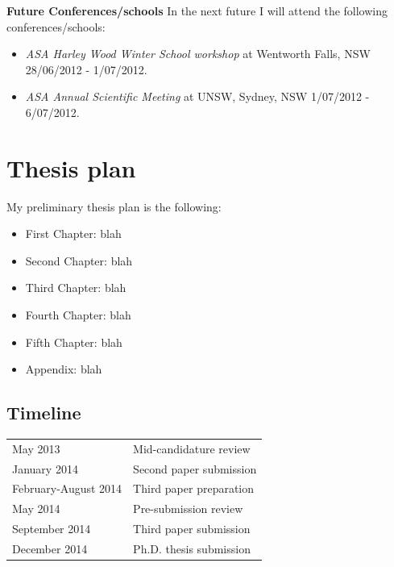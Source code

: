 \documentclass[useAMS,usenatbib,onecolumn]{mn2e}
\begin{document}
	\textbf{Future Conferences/schools}
	In the next future I will attend the following conferences/schools:
	\begin{itemize}
		\item{\textit{ASA Harley Wood Winter School workshop}} at Wentworth Falls, NSW 28/06/2012 - 1/07/2012.
		\item{\textit{ASA Annual Scientific Meeting}} at UNSW, Sydney, NSW 1/07/2012 - 6/07/2012.
	\end{itemize}




\section{Thesis plan}
\label{sec:future} 

My preliminary thesis plan is the following:
\begin{itemize}
\item{First Chapter: } blah
\item{Second Chapter:} blah
\item{Third Chapter:} blah
\item{Fourth Chapter:} blah
\item{Fifth Chapter:} blah
\item{Appendix:} blah
\end{itemize}



\subsection*{Timeline}

\begin{tabular*}{0.75\textwidth}{ l l }
  May 2013 		 							& Mid-candidature review \\
  January 2014								& Second paper submission \\
  February-August 2014		    			& Third paper preparation \\
  May 2014  								& Pre-submission review \\
  September 2014							& Third paper submission \\							 
  December 2014  							& Ph.D. thesis submission \\
\end{tabular*}

\begin{multicols}{2}
	
	{\footnotesize
	\setlength{\itemsep}{1pt}
	\begin{spacing}{0.5}
		{}
	\end{spacing}	}
\end{multicols}
\end{document}
